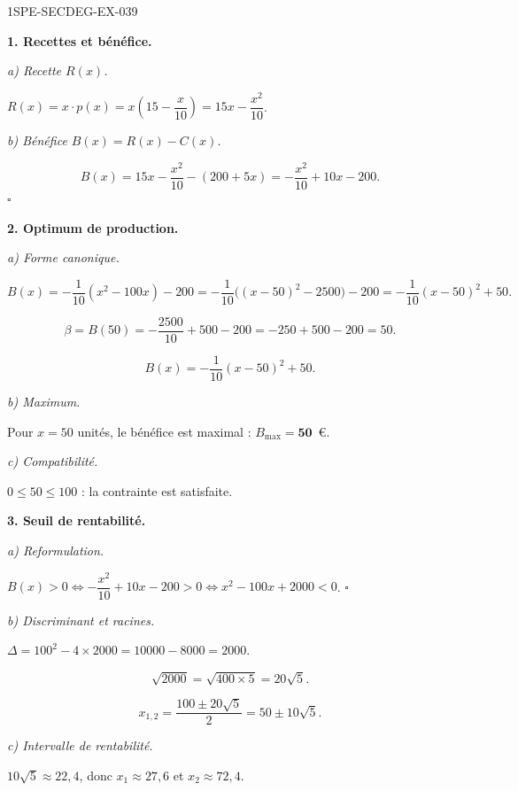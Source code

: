\begin{corrige}{1SPE-SECDEG-EX-039}

\textbf{1. Recettes et bénéfice.}

\textit{a) Recette $R(x)$.}


$R(x) = x \cdot p(x) = x\!\left(15 - \dfrac{x}{10}\right) = 15x - \dfrac{x^2}{10}$.

\textit{b) Bénéfice $B(x) = R(x) - C(x)$.}

\[B(x) = 15x - \frac{x^2}{10} - (200 + 5x) = -\frac{x^2}{10} + 10x - 200.\] \hfill $\square$

\medskip
\textbf{2. Optimum de production.}

\textit{a) Forme canonique.}


\[B(x)=-\frac{1}{10}(x^2-100x)-200
=-\frac{1}{10}\bigl((x-50)^2-2500\bigr)-200
=-\frac{1}{10}(x-50)^2+50.\]

\[\beta = B(50) = -\frac{2500}{10} + 500 - 200 = -250 + 500 - 200 = 50.\]

\[B(x) = -\frac{1}{10}(x - 50)^2 + 50.\]

\textit{b) Maximum.}

Pour $x = 50$ unités, le bénéfice est maximal : $B_{\max} = \mathbf{50}$~\euro.

\textit{c) Compatibilité.}

$0 \leqslant 50 \leqslant 100$ : la contrainte est satisfaite.

\medskip
\textbf{3. Seuil de rentabilité.}

\textit{a) Reformulation.}


$B(x) > 0 \iff -\dfrac{x^2}{10} + 10x - 200 > 0 \iff x^2 - 100x + 2000 < 0$. \hfill $\square$

\textit{b) Discriminant et racines.}

$\Delta = 100^2 - 4 \times 2000 = 10000 - 8000 = 2000$.

\[\sqrt{2000} = \sqrt{400 \times 5} = 20\sqrt{5}.\]

\[x_{1,2} = \frac{100 \pm 20\sqrt{5}}{2} = 50 \pm 10\sqrt{5}.\]

\textit{c) Intervalle de rentabilité.}

$10\sqrt{5} \approx 22{,}4$, donc $x_1 \approx 27{,}6$ et $x_2 \approx 72{,}4$.


\end{corrige}
